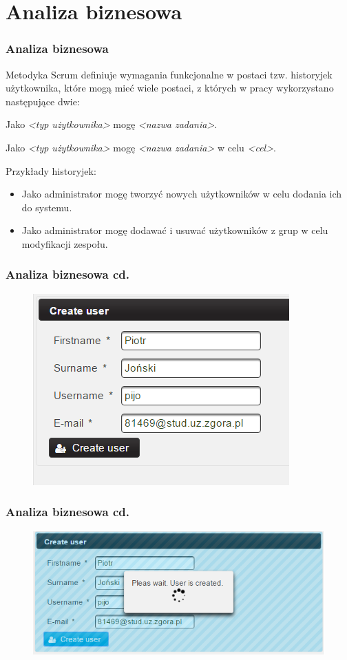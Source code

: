 \documentclass[hyperref={pdfpagelabels=false}]{beamer}
\begin{document}
\section{Analiza biznesowa}
\begin{frame}
	\frametitle{Analiza biznesowa}
	Metodyka Scrum definiuje wymagania funkcjonalne  w postaci tzw.
	historyjek użytkownika, które mogą mieć wiele postaci, z których w pracy wykorzystano następujące dwie:
	\item Jako \textit{\textless typ użytkownika\textgreater} mogę \textit{\textless nazwa zadania\textgreater}.
	\item Jako \textit{\textless typ użytkownika\textgreater} mogę \textit{\textless nazwa zadania\textgreater} w celu \textit{\textless cel\textgreater}.	
	
	Przykłady historyjek:
	\begin{itemize}
		\item Jako administrator mogę tworzyć nowych użytkowników w celu dodania ich do systemu.
		\item Jako administrator mogę dodawać i usuwać użytkowników z grup w celu modyfikacji zespołu.
	\end{itemize}
\end{frame}
\begin{frame}
	\frametitle{Analiza biznesowa cd.}
	\begin{figure}
		\centering
		\includegraphics[width=0.7\linewidth]{user-stworz}
	\end{figure}
\end{frame}
\begin{frame}
	\frametitle{Analiza biznesowa cd.}
	\begin{figure}
	\centering
	\includegraphics[width=1\linewidth]{user-czekanie}
	\end{figure}
\end{frame}
\end{document}
